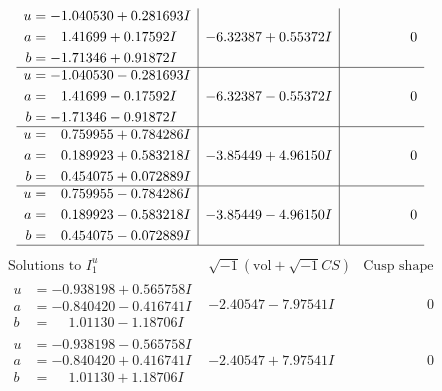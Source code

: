 \documentclass[1p]{elsarticle_modified}
\theoremstyle{definition}
\newcommand{\I}{\sqrt{-1}}
\begin{document}
$$\begin{array}{c|c|c}
\begin{aligned}
u &= -1.040530 + 0.281693 I \\
a &= \phantom{-}1.41699 + 0.17592 I \\
b &= -1.71346 + 0.91872 I\end{aligned}
 & -6.32387 + 0.55372 I & \phantom{-0.000000 } 0 \\ \hline\begin{aligned}
u &= -1.040530 - 0.281693 I \\
a &= \phantom{-}1.41699 - 0.17592 I \\
b &= -1.71346 - 0.91872 I\end{aligned}
 & -6.32387 - 0.55372 I & \phantom{-0.000000 } 0 \\ \hline\begin{aligned}
u &= \phantom{-}0.759955 + 0.784286 I \\
a &= \phantom{-}0.189923 + 0.583218 I \\
b &= \phantom{-}0.454075 + 0.072889 I\end{aligned}
 & -3.85449 + 4.96150 I & \phantom{-0.000000 } 0 \\ \hline\begin{aligned}
u &= \phantom{-}0.759955 - 0.784286 I \\
a &= \phantom{-}0.189923 - 0.583218 I \\
b &= \phantom{-}0.454075 - 0.072889 I\end{aligned}
 & -3.85449 - 4.96150 I & \phantom{-0.000000 } 0\\
 \hline 
 \end{array}$$\newpage$$\begin{array}{c|c|c}  
\text{Solutions to }I^u_{1}& \I (\text{vol} + \sqrt{-1}CS) & \text{Cusp shape}\\
 \hline 
\begin{aligned}
u &= -0.938198 + 0.565758 I \\
a &= -0.840420 - 0.416741 I \\
b &= \phantom{-}1.01130 - 1.18706 I\end{aligned}
 & -2.40547 - 7.97541 I & \phantom{-0.000000 } 0 \\ \hline\begin{aligned}
u &= -0.938198 - 0.565758 I \\
a &= -0.840420 + 0.416741 I \\
b &= \phantom{-}1.01130 + 1.18706 I\end{aligned}
 & -2.40547 + 7.97541 I & \phantom{-0.000000 } 0 \\ \hline\begin{aligned}

\end{aligned}
\end{array}$$
\end{document}
